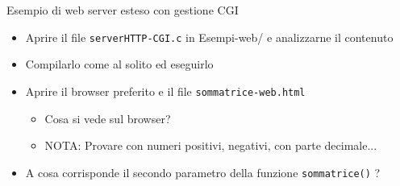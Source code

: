 \documentclass[11pt]{article}
\begin{document}
\begin{tcolorbox}[colback=blue!5!white,colframe=blue!75!black,title=\textbf{DOMANDA}, breakable]
Esempio di web server esteso con gestione CGI
\begin{itemize}
    \item Aprire il file \texttt{serverHTTP-CGI.c} in Esempi-web/ e analizzarne il contenuto
    \item Compilarlo come al solito ed eseguirlo
    \item Aprire il browser preferito e il file \texttt{sommatrice-web.html}
    \begin{itemize}
        \item Cosa si vede sul browser?
        \item NOTA: Provare con numeri positivi, negativi, con parte decimale...
    \end{itemize}
    \item A cosa corrisponde il secondo parametro della funzione \texttt{sommatrice()} ?
\end{itemize}
\end{tcolorbox}
\end{document}
